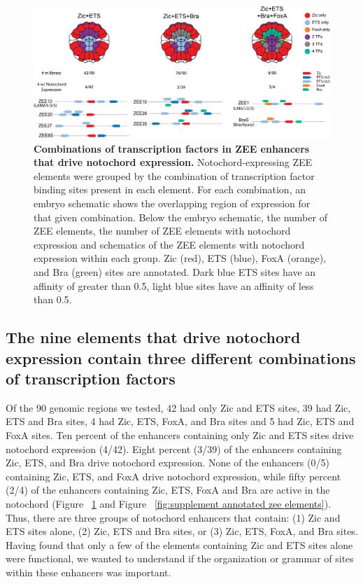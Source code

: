 \begin{figure}[h]
    \centering
    \includegraphics[scale=.55]{2_figures-and-files/Fig3_Notochord-Grammar-Groups.png}
    \caption[Combinations of transcription factors in ZEE enhancers that drive notochord expression]{\textbf{Combinations of transcription factors in ZEE enhancers that drive notochord expression.} Notochord-expressing ZEE elements were grouped by the combination of transcription factor binding sites present in each element. For each combination, an embryo schematic shows the overlapping region of expression for that given combination. Below the embryo schematic, the number of ZEE elements, the number of ZEE elements with notochord expression and schematics of the ZEE elements with notochord expression within each group. Zic (red), ETS (blue), FoxA (orange), and Bra (green) sites are annotated. Dark blue ETS sites have an affinity of greater than 0.5, light blue sites have an affinity of less than 0.5.}
    \label{fig:3 notochord enhancer groups}
\end{figure}

\subsection{The nine elements that drive notochord expression contain three different combinations of transcription factors}

Of the 90 genomic regions we tested, 42 had only Zic and ETS sites, 39 had Zic, ETS and Bra sites, 4 had Zic, ETS, FoxA, and Bra sites and 5 had Zic, ETS and FoxA sites. Ten percent of the enhancers containing only Zic and ETS sites drive notochord expression (4/42). Eight percent (3/39) of the enhancers containing Zic, ETS, and Bra drive notochord expression. None of the enhancers (0/5) containing Zic, ETS, and FoxA drive notochord expression, while fifty percent (2/4) of the enhancers containing Zic, ETS, FoxA and Bra are active in the notochord (Figure ~\ref{fig:3 notochord enhancer groups} and Figure ~\ref{fig:supplement annotated zee elements}). Thus, there are three groups of notochord enhancers that contain: (1) Zic and ETS sites alone, (2) Zic, ETS and Bra sites, or (3) Zic, ETS, FoxA, and Bra sites. Having found that only a few of the elements containing Zic and ETS sites alone were functional, we wanted to understand if the organization or grammar of sites within these enhancers was important.

